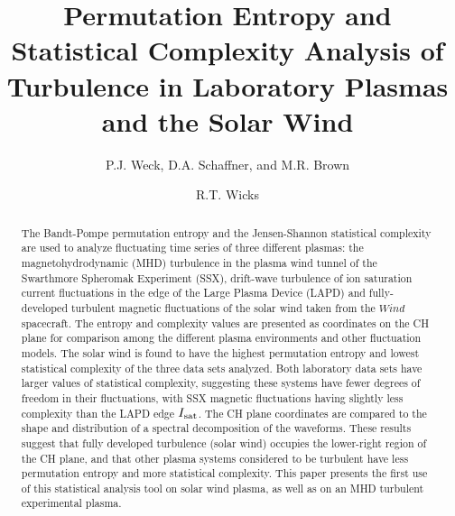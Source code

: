 \documentclass[aps,prx,twocolumn,secnumarabic,nobalancelastpage,amsmath,amssymb,
nofootinbib]{revtex4-1}
\begin{document}
\title{Permutation Entropy and Statistical Complexity Analysis of Turbulence in Laboratory Plasmas and the Solar Wind}
\author{P.J. Weck, D.A. Schaffner, and M.R. Brown}
\author{R.T. Wicks}
\begin{abstract}
The Bandt-Pompe permutation entropy and the Jensen-Shannon statistical complexity are used to analyze fluctuating time series of three different plasmas: the magnetohydrodynamic (MHD) turbulence in the plasma wind tunnel of the Swarthmore Spheromak Experiment (SSX), drift-wave turbulence of ion saturation current fluctuations in the edge of the Large Plasma Device (LAPD) and fully-developed turbulent magnetic fluctuations of the solar wind taken from the $\textit{Wind} $ spacecraft. The entropy and complexity values are presented as coordinates on the CH plane for comparison among the different plasma environments and other fluctuation models. The solar wind is found to have the highest permutation entropy and lowest statistical complexity of the three data sets analyzed. Both laboratory data sets have larger values of statistical complexity, suggesting these systems have fewer degrees of freedom in their fluctuations, with SSX magnetic fluctuations having slightly less complexity than the LAPD edge $I_{\rm sat}$. The CH plane coordinates are compared to the shape and distribution of a spectral decomposition of the waveforms. These results suggest that fully developed turbulence (solar wind) occupies the lower-right region of the CH plane, and that other plasma systems considered to be turbulent have less permutation entropy and more statistical complexity. This paper presents the first use of this statistical analysis tool on solar wind plasma, as well as on an MHD turbulent experimental plasma.
\end{abstract}
\maketitle
\end{document}
